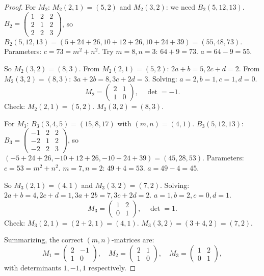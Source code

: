 \documentclass[12pt]{amsart}
\theoremstyle{definition}
\theoremstyle{remark}
\begin{document}
\begin{proof}
For $M_2$: $M_2(2,1)=(5,2)$ and $M_2(3,2)$: we need $B_2(5,12,13)$.
$B_2 = \left(\begin{smallmatrix}1&2&2\\2&1&2\\2&2&3\end{smallmatrix}\right)$,
so $B_2(5,12,13)=(5+24+26, 10+12+26, 10+24+39)=(55,48,73)$.
Parameters: $c=73=m^2+n^2$. Try $m=8,n=3$: $64+9=73$. $a=64-9=55$. \checkmark

So $M_2(3,2) = (8,3)$.  From $M_2(2,1)=(5,2)$: $2a+b=5, 2c+d=2$.
From $M_2(3,2)=(8,3)$: $3a+2b=8, 3c+2d=3$.  Solving: $a=2,b=1,c=1,d=0$.
\begin{equation}
  M_2 = \begin{pmatrix}2&1\\1&0\end{pmatrix}, \quad \det = -1.
\end{equation}
Check: $M_2(2,1) = (5,2)$. \checkmark\quad $M_2(3,2) = (8,3)$. \checkmark

For $M_3$: $B_3(3,4,5)=(15,8,17)$ with $(m,n)=(4,1)$.
$B_3(5,12,13)$: $B_3=\left(\begin{smallmatrix}-1&2&2\\-2&1&2\\-2&2&3\end{smallmatrix}\right)$,
so $(-5+24+26, -10+12+26, -10+24+39) = (45, 28, 53)$.
Parameters: $c=53=m^2+n^2$. $m=7,n=2$: $49+4=53$. $a=49-4=45$. \checkmark

So $M_3(2,1)=(4,1)$ and $M_3(3,2)=(7,2)$.
Solving: $2a+b=4, 2c+d=1, 3a+2b=7, 3c+2d=2$.
$a=1,b=2,c=0,d=1$.
\begin{equation}
  M_3 = \begin{pmatrix}1&2\\0&1\end{pmatrix}, \quad \det = 1.
\end{equation}
Check: $M_3(2,1) = (2+2, 1) = (4,1)$. \checkmark\quad
$M_3(3,2) = (3+4, 2) = (7,2)$. \checkmark

Summarizing, the correct $(m,n)$-matrices are:
\begin{equation}\label{eq:correct-mn}
  M_1 = \begin{pmatrix}2&-1\\1&0\end{pmatrix},\quad
  M_2 = \begin{pmatrix}2&1\\1&0\end{pmatrix},\quad
  M_3 = \begin{pmatrix}1&2\\0&1\end{pmatrix},
\end{equation}
with determinants $1, -1, 1$ respectively.
\end{proof}
\end{document}
